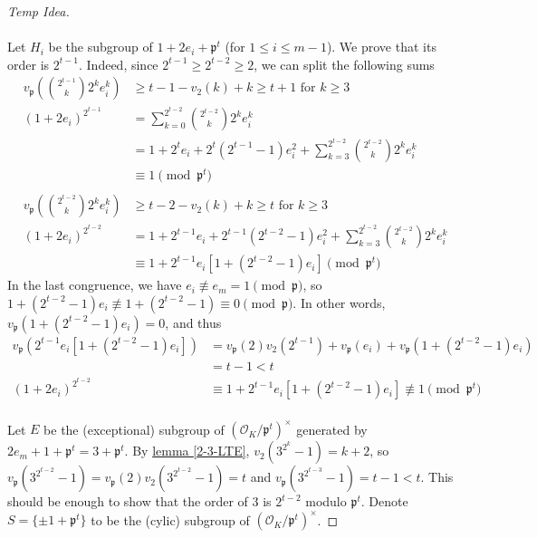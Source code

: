 \documentclass{treatise}
\begin{document}
\begin{shaded}
\begin{proof}[Temp Idea]
\\
\\
Let $H_i$ be the subgroup of $1 + 2 e_i + \mathfrak{p}^t$ (for $1 \leq i \leq m - 1$). We prove that its order is $2^{t - 1}$. Indeed, since $2^{t - 1} \geq 2^{t - 2} \geq 2$, we can split the following sums
\begin{align*}
v_\mathfrak{p} \left( {2^{t - 1} \choose k} 2^k e_i^k \right) & \geq t - 1 - v_2 (k) + k \geq t + 1 \mbox{ for } k \geq 3 \\
(1 + 2 e_i)^{2^{t - 1}} & = \sum_{k = 0}^{2^{t - 2}} {2^{t - 2} \choose k} 2^k e_i^k \\
& = 1 + 2^t e_i + 2^t (2^{t - 1} - 1) e_i^2 + \sum_{k = 3}^{2^{t - 2}} {2^{t - 2} \choose k} 2^k e_i^k \\
& \equiv 1 \pmod{\mathfrak{p}^t} \\
& \\
v_\mathfrak{p} \left( {2^{t - 2} \choose k} 2^k e_i^k \right) & \geq t - 2 - v_2 (k) + k \geq t \mbox{ for } k \geq 3 \\
(1 + 2 e_i)^{2^{t - 2}} & = 1 + 2^{t - 1} e_i + 2^{t - 1} (2^{t - 2} - 1) e_i^2 + \sum_{k = 3}^{2^{t - 2}} {2^{t - 2} \choose k} 2^k e_i^k \\
& \equiv 1 + 2^{t - 1} e_i [1 + (2^{t - 2} - 1) e_i] \pmod{\mathfrak{p}^t}
\end{align*}
In the last congruence, we have $e_i \not\equiv e_m = 1\pmod{\mathfrak{p}}$, so $1 + (2^{t - 2} - 1) e_i \not\equiv 1 + (2^{t - 2} - 1) \equiv 0 \pmod{\mathfrak{p}}$. In other words, $v_\mathfrak{p} (1 + (2^{t - 2} - 1) e_i) = 0$, and thus
\begin{align*}
v_\mathfrak{p} \left( 2^{t - 1} e_i [1 + (2^{t - 2} - 1) e_i] \right) & = v_\mathfrak{p}(2) v_2 (2^{t - 1}) + v_\mathfrak{p}(e_i) + v_\mathfrak{p} (1 + (2^{t - 2} - 1) e_i) \\
& = t - 1 < t \\
(1 + 2 e_i)^{2^{t - 2}} & \equiv 1 + 2^{t - 1} e_i [1 + (2^{t - 2} - 1) e_i] \not\equiv 1 \pmod{\mathfrak{p}^t}
\end{align*}
\\
Let $E$ be the (exceptional) subgroup of $(\mathcal{O}_K / \mathfrak{p}^t)^\times$ generated by $2 e_m + 1 + \mathfrak{p}^t = 3 + \mathfrak{p}^t$. By \hyperref[2-3-LTE]{lemma \ref*{2-3-LTE}}, $v_2 \left( 3^{2^k} - 1 \right) = k + 2$, so $v_\mathfrak{p} \left( 3^{2^{t - 2}} - 1 \right) = v_\mathfrak{p}(2) v_2 \left( 3^{2^{t - 2}} - 1 \right) = t$ and $v_\mathfrak{p} \left( 3^{2^{t - 3}} - 1 \right) = t - 1 < t$. This should be enough to show that the order of 3 is $2^{t - 2}$ modulo $\mathfrak{p}^t$. Denote $S = \{ \pm 1 + \mathfrak{p}^t \}$ to be the (cylic) subgroup of $(\mathcal{O}_K / \mathfrak{p}^t)^\times$.

\end{proof}
\end{shaded}
\end{document}
